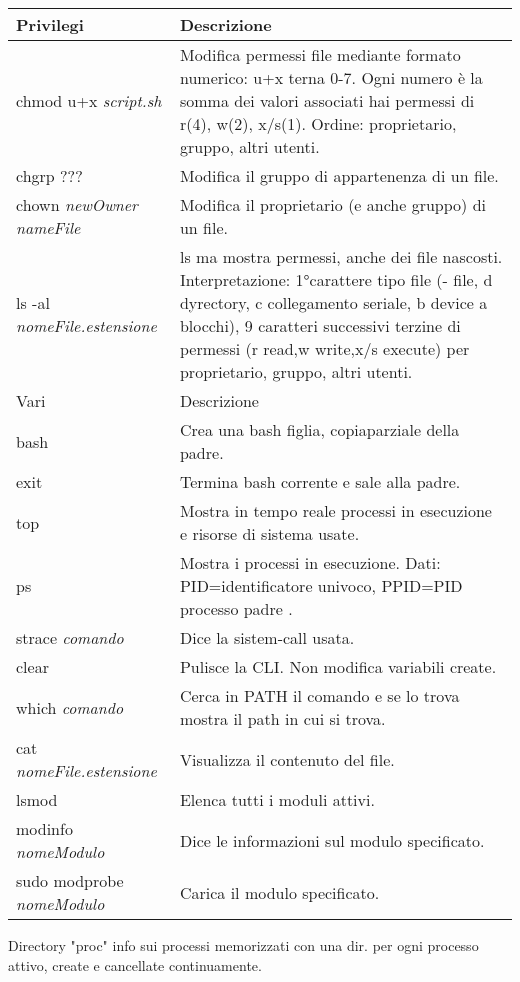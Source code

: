 \documentclass{article}
\newcommand{\sezione}[1]{\hline#1 & Descrizione\\\hline}
\begin{document}
\begin{tabularx}{\textwidth}{lX}
	\sezione{Privilegi}
	chmod u+x \textit{script.sh} & Modifica permessi file mediante formato numerico: u+x terna 0-7. Ogni numero è la somma dei valori associati hai permessi di r(4), w(2), x/s(1). Ordine: proprietario, gruppo, altri utenti.\\
	chgrp ??? & Modifica il gruppo di appartenenza di un file.\\
	chown \textit{newOwner nameFile} & Modifica il proprietario (e anche gruppo) di un file.\\
	ls -al \textit{nomeFile.estensione} & ls ma mostra permessi, anche dei file nascosti. Interpretazione: 1°carattere tipo file (- file, d dyrectory, c collegamento seriale, b device a blocchi), 9 caratteri successivi terzine di permessi (r read,w write,x/s execute) per proprietario, gruppo, altri utenti. \\

	\sezione{Vari}
	bash & Crea una bash figlia, copiaparziale della padre.\\
	exit & Termina bash corrente e sale alla padre.\\
	top & Mostra in tempo reale processi in esecuzione e risorse di sistema usate.\\
	ps & Mostra i processi in esecuzione. Dati: PID=identificatore univoco, PPID=PID processo padre .\\
	strace \textit{comando} & Dice la sistem-call usata.\\
	clear & Pulisce la CLI. Non modifica variabili create.\\
	which \textit{comando} & Cerca in PATH il comando e se lo trova mostra il path in cui si trova. \\
	cat \textit{nomeFile.estensione} & Visualizza il contenuto del file.\\
	lsmod & Elenca tutti i moduli attivi.\\
	modinfo \textit{nomeModulo} & Dice le informazioni sul modulo specificato.\\
	sudo modprobe \textit{nomeModulo} & Carica il modulo specificato.\\
	\hline
	\end{tabularx}

	Directory "proc" info sui processi memorizzati con una dir. per ogni processo attivo, create e cancellate continuamente.
\end{document}
